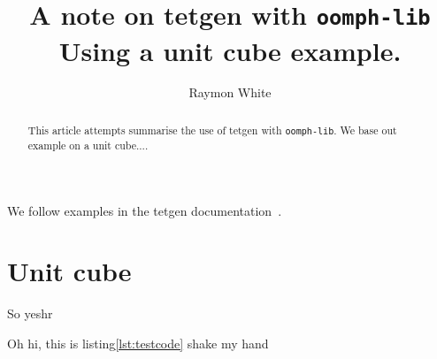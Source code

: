 \documentclass[12pt,twoside,a4paper]{article}
\numberwithin{equation}{section}
\newcommand{\oomphlib}{\texttt{oomph-lib}}
\begin{document}
\title{A note on tetgen with \oomphlib{} \\Using a unit cube example.}
\author{Raymon White}
\maketitle

\begin{abstract}
This article attempts summarise the use of tetgen with \oomphlib{}.
We base out example on a unit cube....
\end{abstract}


We follow examples in the tetgen documentation~\cite{Si2013}.

\section{Unit cube}
So yeshr


Oh hi, this is listing\cref{lst:testcode} shake my  hand




\end{document}
